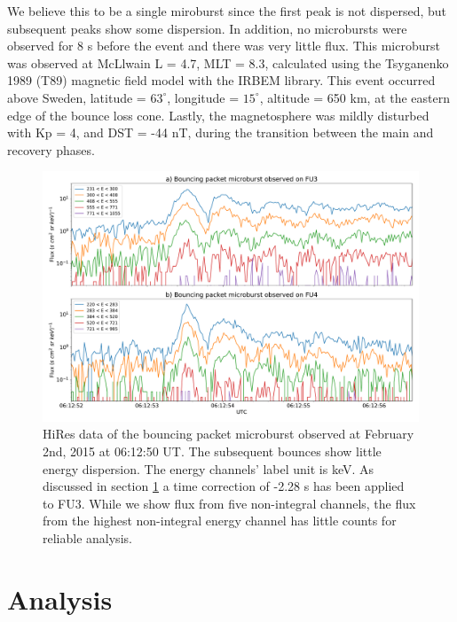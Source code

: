 \documentclass[draft,linenumbers]{agujournal}
\begin{document}
We believe this to be a single miroburst since the first peak is not dispersed, but subsequent peaks show some dispersion. In addition, no microbursts were observed for 8 s before the event and there was very little flux. This microburst was observed at McLlwain L = 4.7, MLT = 8.3, calculated using the Tsyganenko 1989 (T89) magnetic field model \citep{Tsyganenko89} with the IRBEM library. This event occurred above Sweden, latitude = $63^{\circ}$, longitude = $15^{\circ}$, altitude = 650 km, at the eastern edge of the bounce loss cone. Lastly, the magnetosphere was mildly disturbed with Kp = 4, and DST = -44 nT, during the transition between the main and recovery phases.

\begin{figure}
\includegraphics[width=\textwidth]{hires_plot_log.pdf}
\caption{HiRes data of the bouncing packet microburst observed at February 2nd, 2015 at 06:12:50 UT. The subsequent bounces show little energy dispersion. The energy channels' label unit is keV. As discussed in section \ref{analysis} a time correction of -2.28 s has been applied to FU3. While we show flux from five non-integral channels, the flux from the highest non-integral energy channel has little counts for reliable analysis.}
\label{hires_plot}
\end{figure}

\section{Analysis} \label{analysis} %
\end{document}
